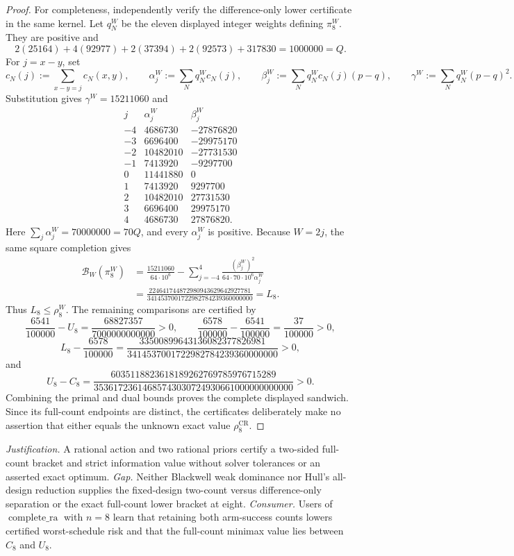\documentclass{article}
\begin{document}
\begin{proof}
For completeness, independently verify the difference-only lower certificate in the same kernel.  Let \(q_N^W\) be the eleven displayed integer weights defining \(\pi_8^W\).  They are positive and
\[
 2(25164)+4(92977)+2(37394)+2(92573)+317830=1000000=Q.
\]
For \(j=x-y\), set
\[
 c_N(j):=\sum_{x-y=j}c_N(x,y),\qquad
 \alpha_j^W:=\sum_Nq_N^Wc_N(j),\qquad
 \beta_j^W:=\sum_Nq_N^Wc_N(j)(p-q),\qquad
 \gamma^W:=\sum_Nq_N^W(p-q)^2.
\]
Substitution gives \(\gamma^W=15211060\) and
\[
\begin{array}{c|r|r}
j&\alpha_j^W&\beta_j^W\\ \hline
-4&4686730&-27876820\\
-3&6696400&-29975170\\
-2&10482010&-27731530\\
-1&7413920&-9297700\\
0&11441880&0\\
1&7413920&9297700\\
2&10482010&27731530\\
3&6696400&29975170\\
4&4686730&27876820.
\end{array}
\]
Here \(\sum_j\alpha_j^W=70000000=70Q\), and every \(\alpha_j^W\) is positive.  Because \(W=2j\), the same square completion gives
\[
\begin{aligned}
 \mathcal B_W(\pi_8^W)
 &=\frac{15211060}{64\cdot10^6}
 -\sum_{j=-4}^4\frac{(\beta_j^W)^2}{64\cdot70\cdot10^6\alpha_j^W}\\
 &=\frac{224641744872980943629642927781}
 {3414537001722982784239360000000}=L_8.
\end{aligned}
\]
Thus \(L_8\leq\rho_8^W\).  The remaining comparisons are certified by
\[
 \frac{6541}{100000}-U_8
 =\frac{68827357}{7000000000000}>0,
 \qquad
 \frac{6578}{100000}-\frac{6541}{100000}=\frac{37}{100000}>0,
\]
\[
 L_8-\frac{6578}{100000}
 =\frac{33500899643136082377826981}
 {3414537001722982784239360000000}>0,
\]
and
\[
 U_8-C_8
 =\frac{6035118823618189262769785976715289}
 {35361723614685743030724930661000000000000}>0.
\]
Combining the primal and dual bounds proves the complete displayed sandwich.  Since its full-count endpoints are distinct, the certificates deliberately make no assertion that either equals the unknown exact value \(\rho_8^{\mathrm{CR}}\).
\end{proof}
\par\smallskip\noindent \textit{Justification.} A rational action and two rational priors certify a two-sided full-count bracket and strict information value without solver tolerances or an asserted exact optimum. \textit{Gap.} Neither Blackwell weak dominance nor Hull's all-design reduction supplies the fixed-design two-count versus difference-only separation or the exact full-count lower bracket at eight. \textit{Consumer.} Users of \(\operatorname{complete\_ra}\) with \(n=8\) learn that retaining both arm-success counts lowers certified worst-schedule risk and that the full-count minimax value lies between \(C_8\) and \(U_8\).
\end{document}
